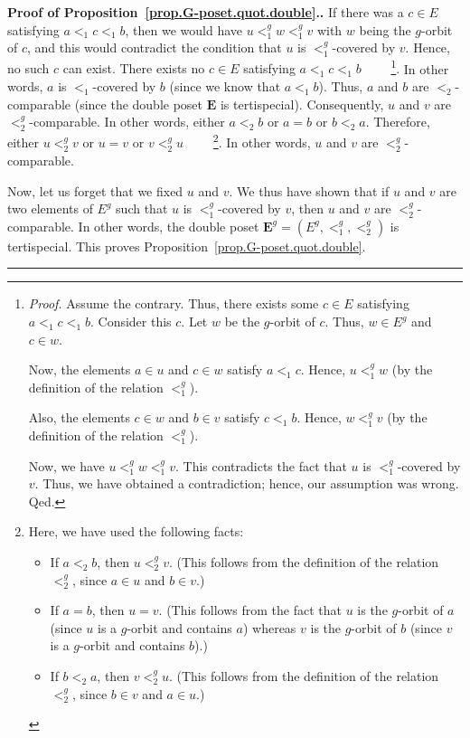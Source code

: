\documentclass[numbers=enddot,12pt,final,onecolumn,notitlepage,abstracton]{scrartcl}
\theoremstyle{definition}
\newenvironment{proof}[1][Proof]{\noindent\textbf{#1.} }{\ \rule{0.5em}{0.5em}}
\newenvironment{verlong}{}{}
\newenvironment{vershort}{}{}
\newcommand{\EE}{{\mathbf{E}}}
\begin{document}
\begin{proof}[Proof of Proposition~\ref{prop.G-poset.quot.double}.]
\begin{vershort}
If there was a $c \in E$ satisfying $a <_1 c <_1 b$, then we
would have $u <_1^g w <_1^g v$ with $w$ being the $g$-orbit of
$c$, and this would contradict the condition that $u$ is
$<_1^g$-covered by $v$. Hence, no such $c$ can exist.
\end{vershort}
\begin{verlong}
There exists no $c \in E$ satisfying $a <_1 c <_1 b$
\ \ \ \ \footnote{\textit{Proof.} Assume the contrary. Thus,
there exists some $c \in E$ satisfying $a <_1 c <_1 b$. Consider
this $c$. Let $w$ be the $g$-orbit of $c$. Thus, $w \in E^g$
and $c \in w$.
\par
Now, the elements $a \in u$ and $c \in w$ satisfy
$a <_1 c$. Hence, $u <_1^g w$ (by the definition of the
relation $<_1^g$).
\par
Also, the elements $c \in w$ and $b \in v$ satisfy
$c <_1 b$. Hence, $w <_1^g v$ (by the definition of the
relation $<_1^g$).
\par
Now, we have $u <_1^g w <_1^g v$. This contradicts the
fact that $u$ is $<_1^g$-covered by $v$. Thus, we have
obtained a contradiction; hence, our assumption was wrong.
Qed.}.
\end{verlong}
In other words, $a$ is $<_1$-covered by $b$ (since we know that
$a <_1 b$). Thus, $a$ and $b$ are $<_2$-comparable (since the
double poset $\EE$ is tertispecial).
\begin{vershort}
Consequently, $u$ and $v$ are $<_2^g$-comparable.
\end{vershort}
\begin{verlong}
In other words, either $a <_2 b$ or $a = b$ or $b <_2 a$.
Therefore, either $u <_2^g v$ or $u = v$ or $v <_2^g u$
\ \ \ \ \footnote{Here, we have used the following facts:
\begin{itemize}
\item If $a <_2 b$, then $u <_2^g v$. (This follows from the
definition of the relation $<_2^g$, since $a \in u$ and
$b \in v$.)
\item If $a = b$, then $u = v$. (This follows from the
fact that $u$ is the $g$-orbit of $a$ (since $u$ is a $g$-orbit
and contains $a$) whereas $v$ is the $g$-orbit of $b$
(since $v$ is a $g$-orbit and contains $b$).)
\item If $b <_2 a$, then $v <_2^g u$. (This follows from the
definition of the relation $<_2^g$, since $b \in v$ and
$a \in u$.)
\end{itemize}
}. In other words, $u$ and $v$ are $<_2^g$-comparable.
\end{verlong}

Now, let us forget that we fixed $u$ and $v$. We thus have shown that if
$u$ and $v$ are two elements of $E^{g}$ such that $u$ is $<_{1}^{g}$-covered
by $v$, then $u$ and $v$ are $<_{2}^{g}$-comparable. In other words, the
double poset $\EE^g = \left(E^g, <_1^g, <_2^g\right)$ is tertispecial. This
proves Proposition~\ref{prop.G-poset.quot.double}.
\end{proof}
\end{document}
